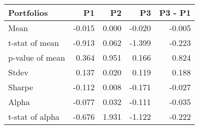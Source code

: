 \begin{tabular}{lrrrr}
\toprule
Portfolios & P1 & P2 & P3 & P3 - P1 \\
\midrule
Mean & -0.015 & 0.000 & -0.020 & -0.005 \\
t-stat of mean & -0.913 & 0.062 & -1.399 & -0.223 \\
p-value of mean & 0.364 & 0.951 & 0.166 & 0.824 \\
Stdev & 0.137 & 0.020 & 0.119 & 0.188 \\
Sharpe & -0.112 & 0.008 & -0.171 & -0.027 \\
Alpha & -0.077 & 0.032 & -0.111 & -0.035 \\
t-stat of alpha & -0.676 & 1.931 & -1.122 & -0.222 \\
\bottomrule
\end{tabular}
